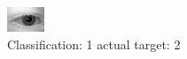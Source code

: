 \begin{figure}[h!]
\begin{center}
\includegraphics[width=0.60\columnwidth]{figures/ID375_class_1_target_2.png}
\end{center}
\caption{ Classification: 1 actual target: 2}
\label{fig:ID375_class_1_target_2}
\end{figure}

